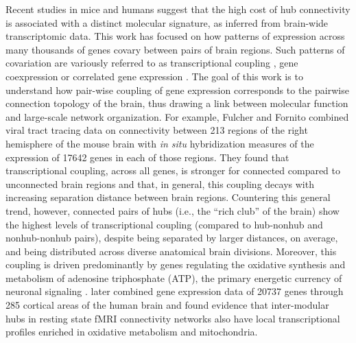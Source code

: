 Recent studies in mice and humans suggest that the high cost of hub connectivity is associated with a distinct
molecular signature, as inferred from brain-wide transcriptomic data.
This work has focused on how patterns of expression across many thousands of genes covary between pairs of brain regions.
Such patterns of covariation are variously referred to as transcriptional coupling \citep{Fulcher2016}, gene coexpression \citep{Krienen2016} or correlated gene expression \citep{Richiardi2015, Mills2018, Goel2014}.
The goal of this work is to understand how pair-wise coupling of gene expression corresponds to the pairwise connection topology of the brain, thus drawing a link between molecular function and large-scale network organization.
For example, Fulcher and Fornito \citep{Fulcher2016} combined viral tract tracing data on connectivity between 213 regions of the right hemisphere of the mouse brain \citep{Oh2014} with \emph{in situ} hybridization measures of the expression of \num{17642} genes in each of those regions.
They found that transcriptional coupling, across all genes, is stronger for connected compared to unconnected brain regions and that, in general, this coupling decays with increasing separation distance between brain regions.
Countering this general trend, however, connected pairs of hubs (i.e., the ``rich club'' of the brain) show the highest levels of transcriptional coupling (compared to hub-nonhub and nonhub-nonhub pairs), despite being separated by larger distances, on average, and being distributed across diverse anatomical brain divisions.
Moreover, this coupling is driven predominantly by genes regulating the oxidative synthesis and metabolism of adenosine triphosphate (ATP), the primary energetic currency of neuronal signaling \citep{Lennie2003, Laughlin2003}. \citet{Vertes2016b} later combined gene expression data of \num{20737} genes through 285 cortical areas of the human brain and found evidence that inter-modular hubs in resting state fMRI connectivity networks also have local transcriptional profiles enriched in oxidative metabolism and mitochondria.

